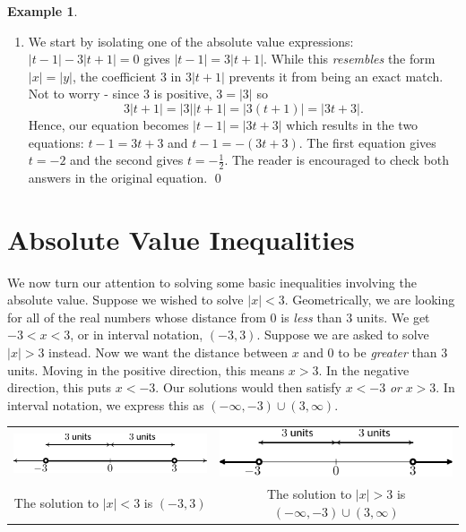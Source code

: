 \documentclass[11pt]{article}
\theoremstyle{definition}  %
\newtheorem{ex}{\bf Example}
\begin{document}
\begin{ex}
\begin{enumerate}
\item We start by isolating one of the absolute value expressions:  $|t-1| - 3|t+1| = 0$ gives $|t-1| = 3|t+1|$.  While this \textit{resembles} the form $|x| = |y|$, the coefficient $3$ in $3|t+1|$ prevents it from being an exact match.  Not to worry - since $3$ is positive, $3 = |3|$ so \[3|t+1| = |3| |t+1| = |3(t+1)| = |3t+3|.\]  Hence, our equation becomes $|t-1| = |3t+3|$ which results in the two equations:  $t-1 = 3t+3$ and $t-1 = -(3t+3)$.  The first equation gives $t = -2$ and the second gives $t = -\frac{1}{2}$.  The reader is encouraged to check both answers in the original equation. \qed

\end{enumerate}

\end{ex}


\section{Absolute Value Inequalities}
\label{basicabsvalineq}

We now turn our attention to solving some basic inequalities involving the absolute value.  Suppose we wished to solve $|x| < 3$.  Geometrically, we are looking for all of the real numbers whose distance from $0$ is \textit{less} than $3$ units.  We get $-3 < x < 3$, or in interval notation, $(-3,3)$.  Suppose we are asked to solve $|x| > 3$ instead.  Now we want the distance between $x$ and $0$ to be \textit{greater} than $3$ units.  Moving in the positive direction, this means $x > 3$.  In the negative direction, this puts $x < -3$.  Our solutions would then satisfy $x < -3$ \textit{or} $x > 3$.  In interval notation, we express this as $(-\infty, -3) \cup (3, \infty)$.  


\begin{center}

\begin{tabular}{cc}

\includegraphics{AbsValEqIneq-4}

& 

\includegraphics{AbsValEqIneq-5}

\\




The solution to  $|x| < 3$ is $(-3,3)$ &   The solution to  $|x| > 3$ is $(-\infty, -3) \cup (3, \infty)$ \\

\end{tabular}

\end{center}
\end{document}
